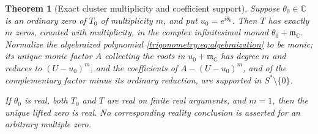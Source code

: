 \documentclass[11pt,letterpaper]{article}
\numberwithin{equation}{section}
\newtheorem{theorem}{Theorem}[section]
\theoremstyle{definition}
\theoremstyle{remark}
\newcommand{\C}{\mathbb C}
\newcommand{\mm}{\mathfrak m}
\begin{document}
\begin{theorem}[Exact cluster multiplicity and coefficient support]\label{trigonometry:thm:cluster}
Suppose $\theta_0\in\C$ is an ordinary zero of $T_0$ of multiplicity $m$, and put
$u_0=e^{i\theta_0}$. Then $T$ has \emph{exactly} $m$ zeros, counted with multiplicity, in the
complex infinitesimal monad $\theta_0+\mm_{\C}$. Normalize the algebraized polynomial
\cref{trigonometry:eq:algebraization} to be monic; its unique monic factor $A$ collecting the roots
in $u_0+\mm_{\C}$ has degree $m$ and reduces to $(U-u_0)^m$, and the coefficients of
$A-(U-u_0)^m$, and of the complementary factor minus its ordinary reduction, are supported in
$S^*\setminus\{0\}$.

If $\theta_0$ is real, both $T_0$ and $T$ are real on finite real arguments, and $m=1$, then the
unique lifted zero is real. \emph{No corresponding reality conclusion is asserted for an arbitrary
multiple zero.}
\end{theorem}
\end{document}
